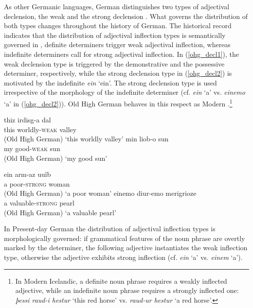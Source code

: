 \documentclass[output=paper
                ,modfonts
                ,nonflat
	        ,collection
	        ,collectionchapter
	        ,collectiontoclongg
 	        ,biblatex
                ,babelshorthands
                ,newtxmath
                ,draftmode
                ,colorlinks, citecolor=brown
]{./langsci/langscibook}
\begin{document}
As other Germanic languages, German distinguishes two types of adjectival declension, \ie the weak and the strong declension \citep{VeSlPe2014}. What governs the distribution of both types changes throughout the history of German. The historical record indicates that the distribution of adjectival inflection types is semantically governed in , \ie definite determiners trigger weak adjectival inflection, whereas indefinite determiners call for strong adjectival inflection. In (\ref{ohg_decl1}), the weak declension type is triggered by the demonstrative and the possessive determiner, respectively, while the strong declension type in (\ref{ohg_decl2}) is motivated by the indefinite \textit{ein} `ein'. The strong declension type is used irrespective of the morphology of the indefinite determiner (cf. \textit{ein} `a' vs. \textit{einemo} `a' in (\ref{ohg_decl2})). Old High German behaves in this respect as Modern .\footnote{In Modern Icelandic, a definite noun phrase requires a weakly inflected adjective, while an indefinite noun phrase requires a strongly inflected one: \textit{þessi raud-i hestur} `this red horse' vs. \textit{raud-ur hestur} `a red horse'.} 

      
\eal \label{ohg_decl1}
\ex
\gll thiz irdisg-a dal \\  this worldly-\textsc{weak}{} valley \\ \hfill (Old High German)
\glt `this worldly valley'
\ex
\gll min liob-o sun \\ my good-\textsc{weak} sun \\  \hfill (Old High German)
\glt `my good sun'
\zl

\eal \label{ohg_decl2}
\ex 
\gll ein arm-az uuîb \\ a poor-\textsc{strong} woman \\ \hfill (Old High German)
\glt `a poor woman'
\ex 
\gll einemo diur-emo merigrioze \\ a valuable-\textsc{strong} pearl \\ \hfill (Old High German)
\glt `a valuable pearl'

\zl
In Present-day German the distribution of adjectival inflection types is morphologically governed: if grammatical features of the noun phrase are overtly marked by the determiner, the following adjective instantiates the weak inflection type, otherwise the adjective exhibits strong inflection (cf. \textit{ein} `a' vs. \textit{einem} `a').
       
\end{document}
